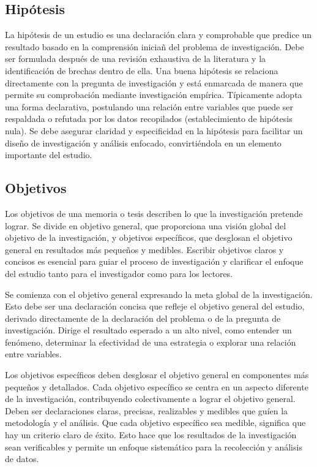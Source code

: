 \subsection{Hipótesis}
La hipótesis de un estudio es una declaración clara y comprobable que predice un resultado basado en la comprensión iniciañ del problema de investigación. Debe ser formulada después de una revisión exhaustiva de la literatura y la identificación de brechas dentro de ella. Una buena hipótesis se relaciona directamente con la pregunta de investigación y está enmarcada de manera que permite su comprobación mediante investigación empírica. Típicamente adopta una forma declarativa, postulando una relación entre variables que puede ser respaldada o refutada por los datos recopilados (establecimiento de hipótesis nula). Se debe asegurar claridad y especificidad en la hipótesis para facilitar un diseño de investigación y análisis enfocado, convirtiéndola en un elemento importante del estudio.

\subsection{Objetivos}
Los objetivos de una memoria o tesis describen lo que la investigación pretende lograr. Se divide en objetivo general, que proporciona una visión global del objetivo de la investigación, y objetivos específicos, que desglosan el objetivo general en resultados más pequeños y medibles. Escribir objetivos claros y concisos es esencial para guiar el proceso de investigación y clarificar el enfoque del estudio tanto para el investigador como para los lectores.

Se comienza con el objetivo general expresando la meta global de la investigación. Esto debe ser una declaración concisa que refleje el objetivo general del estudio, derivado directamente de la declaración del problema o de la pregunta de investigación. Dirige el resultado esperado a un alto nivel, como entender un fenómeno, determinar la efectividad de una estrategia o explorar una relación entre variables.

Los objetivos específicos deben desglosar el objetivo general en componentes más pequeños y detallados. Cada objetivo específico se centra en un aspecto diferente de la investigación, contribuyendo colectivamente a lograr el objetivo general. Deben ser declaraciones claras, precisas, realizables y medibles que guíen la metodología y el análisis. Que cada objetivo específico sea medible, significa que hay un criterio claro de éxito. Esto hace que los resultados de la investigación sean verificables y permite un enfoque sistemático para la recolección y análisis de datos.

